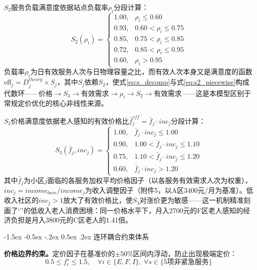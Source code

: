 \documentclass[zihao=-4]{cumcmthesis}
\makeatletter
\renewcommand\subsubsection{\@startsection{subsubsection}{3}{\z@}%
    {-1.5ex \@plus -0.5ex \@minus -.2ex}%
    {0.5ex \@plus .2ex}%
    {\normalfont\normalsize\bfseries}}
\makeatother
\begin{document}
$S_2$服务负载满意度依据站点负载率$\rho_i$分段计算：
\begin{equation}
S_2(\rho_i) = \begin{cases}
1.00, & \rho_i \le 0.60 \\
0.93, & 0.60 < \rho_i \le 0.75 \\
0.85, & 0.75 < \rho_i \le 0.85 \\
0.72, & 0.85 < \rho_i \le 0.95 \\
0.60, & \rho_i > 0.95
\end{cases}
\label{eq:s2_piecewise}
\end{equation}
负载率$\rho_i$为日有效服务人次与日物理容量之比，而有效人次本身又是满意度的函数$\text{eff}_j = D_j^{theory} \times S_j$，其中$S_j$依赖$S_2$，使式\eqref{eq:s_decomp}与式\eqref{eq:s2_piecewise}构成代数环——价格$\to S_3\to$有效需求$\to\rho_i\to S_2\to$有效需求——这是本模型区别于常规定价优化的核心非线性来源。

$S_3$价格满意度依据老人感知的有效价格比$\bar{f}_j^{eff} = \bar{f}_j \cdot inc_j$分段计算：
\begin{equation}
S_3(\bar{f}_j, inc_j) = \begin{cases}
1.00, & \bar{f}_j \cdot inc_j \le 1.00 \\
0.90, & 1.00 < \bar{f}_j \cdot inc_j \le 1.10 \\
0.75, & 1.10 < \bar{f}_j \cdot inc_j \le 1.20 \\
0.60, & \bar{f}_j \cdot inc_j > 1.20
\end{cases}
\label{eq:s3_piecewise}
\end{equation}
其中$\bar{f}_j$为小区$j$面临的各服务加权平均价格因子（以各服务有效需求人次为权重），$inc_j = income_{base} / income_j$为收入调整因子（附件5，以A区3400元/月为基准）。低收入社区的$inc_j > 1$放大了有效价格比，使$S_3$对涨价更为敏感——这一机制精准刻画了\lq{}\rq\rq{}的低收入老人消费困境：同一价格水平下，月入2700元的F区老人感知的经济负担是月入3800元的C区老人的1.41倍。

\subsubsection{连环耦合约束体系}

\textbf{价格边界约束。}定价因子在基准价的$\pm 50\%$区间内浮动，防止出现极端定价：
\begin{equation}
0.5 \le f_i^s \le 1.5, \quad \forall i \in \{E,F,I\},\; \forall s \in \{\text{5项非紧急服务}\}
\label{eq:pricebound}
\end{equation}
\end{document}
